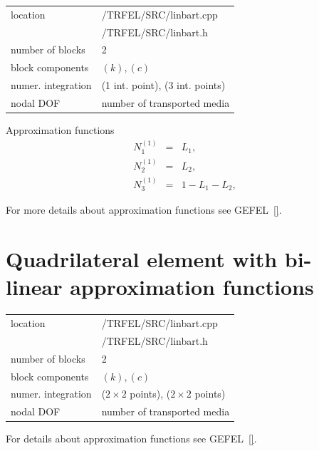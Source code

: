 \begin{center}
\begin{tabular}{|l|l|}
\hline
location & /TRFEL/SRC/linbart.cpp\\
         & /TRFEL/SRC/linbart.h
\\ \hline
number of blocks & 2
\\ \hline
block components & $(k), (c)$
\\ \hline
numer. integration & (1 int. point), (3 int. points)
\\ \hline
nodal DOF & number of transported media
\\ \hline
\end{tabular}
\end{center}

Approximation functions
\begin{eqnarray}
N_1^{(1)} &=& L_1,\nonumber\\
N_2^{(1)} &=& L_2,\nonumber\\
N_3^{(1)} &=& 1-L_1-L_2,
\end{eqnarray}

For more details about approximation functions see GEFEL~\ref{}.

\section{Quadrilateral element with bi-linear approximation functions}
\label{quadlint}

\begin{center}
\begin{tabular}{|l|l|}
\hline
location & /TRFEL/SRC/linbart.cpp\\
         & /TRFEL/SRC/linbart.h
\\ \hline
number of blocks & 2
\\ \hline
block components & $(k), (c)$
\\ \hline
numer. integration & ($2 \times 2$ points), ($2 \times 2$ points)
\\ \hline
nodal DOF & number of transported media
\\ \hline
\end{tabular}
\end{center}

For details about approximation functions see GEFEL~\ref{}.

